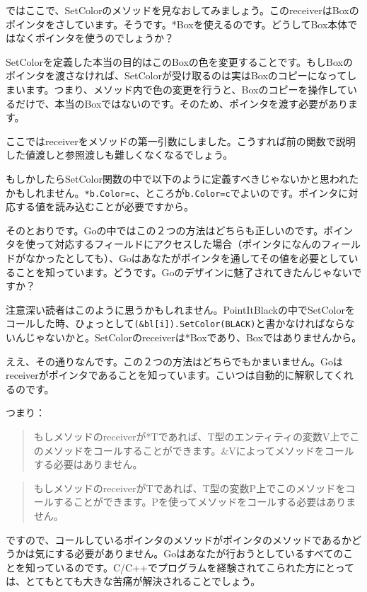 ではここで、SetColorのメソッドを見なおしてみましょう。このreceiverはBoxのポインタをさしています。そうです。*Boxを使えるのです。どうしてBox本体ではなくポインタを使うのでしょうか？

SetColorを定義した本当の目的はこのBoxの色を変更することです。もしBoxのポインタを渡さなければ、SetColorが受け取るのは実はBoxのコピーになってしまいます。つまり、メソッド内で色の変更を行うと、Boxのコピーを操作しているだけで、本当のBoxではないのです。そのため、ポインタを渡す必要があります。

ここではreceiverをメソッドの第一引数にしました。こうすれば前の関数で説明した値渡しと参照渡しも難しくなくなるでしょう。

もしかしたらSetColor関数の中で以下のように定義すべきじゃないかと思われたかもしれません。\texttt{*b.Color=c}、ところが\texttt{b.Color=c}でよいのです。ポインタに対応する値を読み込むことが必要ですから。

そのとおりです。Goの中ではこの２つの方法はどちらも正しいのです。ポインタを使って対応するフィールドにアクセスした場合（ポインタになんのフィールドがなかったとしても）、Goはあなたがポインタを通してその値を必要としていることを知っています。どうです。Goのデザインに魅了されてきたんじゃないですか？

注意深い読者はこのように思うかもしれません。PointItBlackの中でSetColorをコールした時、ひょっとして\texttt{(\&bl[i]).SetColor(BLACK)}と書かなければならないんじゃないかと。SetColorのreceiverは*Boxであり、Boxではありませんから。

ええ、その通りなんです。この２つの方法はどちらでもかまいません。Goはreceiverがポインタであることを知っています。こいつは自動的に解釈してくれるのです。

つまり：

\begin{quote}
もしメソッドのreceiverが*Tであれば、T型のエンティティの変数V上でこのメソッドをコールすることができます。\&Vによってメソッドをコールする必要はありません。
\end{quote}



\begin{quote}
もしメソッドのreceiverがTであれば、T型の変数P上でこのメソッドをコールすることができます。Pを使ってメソッドをコールする必要はありません。
\end{quote}

ですので、コールしているポインタのメソッドがポインタのメソッドであるかどうかは気にする必要がありません。Goはあなたが行おうとしているすべてのことを知っているのです。C/C++でプログラムを経験されてこられた方にとっては、とてもとても大きな苦痛が解決されることでしょう。
